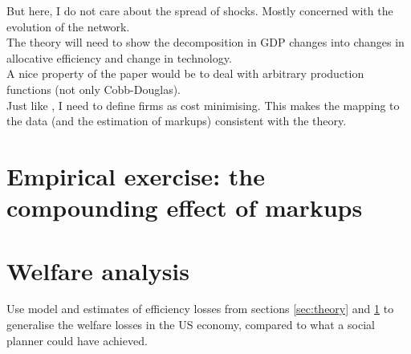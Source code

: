 \documentclass{amsart}
\theoremstyle{definition}
\theoremstyle{remark}
\numberwithin{equation}{section}
\begin{document}
But here, I do not care about the spread of shocks. Mostly concerned with the evolution of the network.\\

The theory will need to show the decomposition in GDP changes into changes in allocative efficiency and change in technology.\\

A nice property of the paper would be to deal with arbitrary production functions (not only Cobb-Douglas).\\

Just like \cite{baqaee2017productivity}, I need to define firms as cost minimising. This makes the mapping to the data (and the estimation of markups) consistent with the theory.

\section{Empirical exercise: the compounding effect of markups}
\label{sec:empirics}


\section{Welfare analysis}

Use model and estimates of efficiency losses from sections \ref{sec:theory} and \ref{sec:empirics} to generalise the welfare losses in the US economy, compared to what a social planner could have achieved.

\newpage



\end{document}
